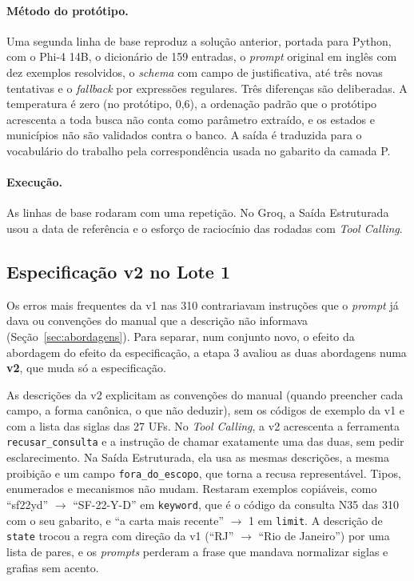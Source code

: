 \paragraph{Método do protótipo.} Uma segunda linha de base reproduz a solução anterior, portada para Python, com o Phi-4 14B, o dicionário de 159 entradas, o \textit{prompt} original em inglês com dez exemplos resolvidos, o \textit{schema} com campo de justificativa, até três novas tentativas e o \textit{fallback} por expressões regulares. Três diferenças são deliberadas. A temperatura é zero (no protótipo, 0,6), a ordenação padrão que o protótipo acrescenta a toda busca não conta como parâmetro extraído, e os estados e municípios não são validados contra o banco. A saída é traduzida para o vocabulário do trabalho pela correspondência usada no gabarito da camada P.

\paragraph{Execução.} As linhas de base rodaram com uma repetição. No Groq, a Saída Estruturada usou a data de referência e o esforço de raciocínio das rodadas com \textit{Tool Calling}.

\subsection{Especificação v2 no Lote 1}
\label{sec:v2}

Os erros mais frequentes da v1 nas 310 contrariavam instruções que o \textit{prompt} já dava ou convenções do manual que a descrição não informava (Seção~\ref{sec:abordagens}). Para separar, num conjunto novo, o efeito da abordagem do efeito da especificação, a etapa 3 avaliou as duas abordagens numa \textbf{v2}, que muda só a especificação.

As descrições da v2 explicitam as convenções do manual (quando preencher cada campo, a forma canônica, o que não deduzir), sem os códigos de exemplo da v1 e com a lista das siglas das 27 UFs. No \textit{Tool Calling}, a v2 acrescenta a ferramenta \texttt{recusar\_consulta} e a instrução de chamar exatamente uma das duas, sem pedir esclarecimento. Na Saída Estruturada, ela usa as mesmas descrições, a mesma proibição e um campo \texttt{fora\_do\_escopo}, que torna a recusa representável. Tipos, enumerados e mecanismos não mudam. Restaram exemplos copiáveis, como ``sf22yd'' $\rightarrow$ ``SF-22-Y-D'' em \texttt{keyword}, que é o código da consulta N35 das 310 com o seu gabarito, e ``a carta mais recente'' $\rightarrow$ 1 em \texttt{limit}. A descrição de \texttt{state} trocou a regra com direção da v1 (``RJ'' $\rightarrow$ ``Rio de Janeiro'') por uma lista de pares, e os \textit{prompts} perderam a frase que mandava normalizar siglas e grafias sem acento.

